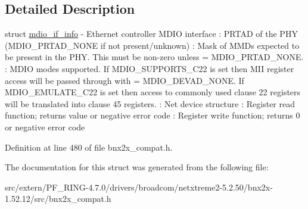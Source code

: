 \subsection{Detailed Description}
struct \hyperlink{structmdio__if__info}{mdio\_\-if\_\-info} -\/ Ethernet controller MDIO interface : PRTAD of the PHY (MDIO\_\-PRTAD\_\-NONE if not present/unknown) : Mask of MMDs expected to be present in the PHY. This must be non-\/zero unless  = MDIO\_\-PRTAD\_\-NONE. : MDIO modes supported. If MDIO\_\-SUPPORTS\_\-C22 is set then MII register access will be passed through with  = MDIO\_\-DEVAD\_\-NONE. If MDIO\_\-EMULATE\_\-C22 is set then access to commonly used clause 22 registers will be translated into clause 45 registers. : Net device structure : Register read function; returns value or negative error code : Register write function; returns 0 or negative error code 

Definition at line 480 of file bnx2x\_\-compat.h.



The documentation for this struct was generated from the following file:\begin{DoxyCompactItemize}
\item 
src/extern/PF\_\-RING-\/4.7.0/drivers/broadcom/netxtreme2-\/5.2.50/bnx2x-\/1.52.12/src/bnx2x\_\-compat.h\end{DoxyCompactItemize}
